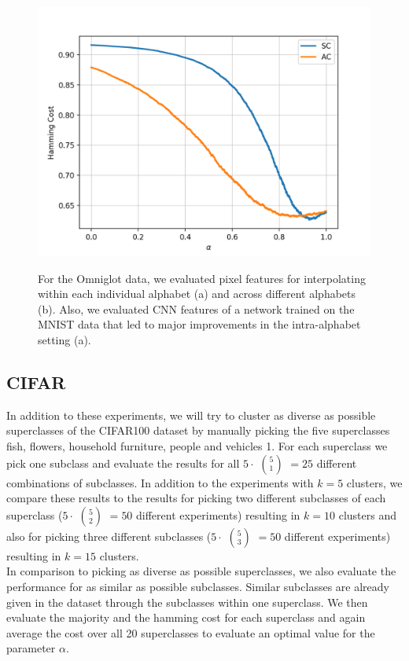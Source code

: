 \begin{figure}[H]
\begin{minipage}{.45\textwidth}
  {\includegraphics[width=\linewidth]{plots/omniglot_inter}}
\end{minipage}
\caption{For the Omniglot data, we evaluated pixel features for interpolating within each individual alphabet (a) and across different alphabets (b). Also, we evaluated CNN features of a network trained on the MNIST data that led to major improvements in the intra-alphabet setting (a).}
\label{fig:omniglot_overview}
\end{figure}

\subsection{CIFAR}

In addition to these experiments, we will try to cluster as diverse as possible superclasses of the CIFAR100 dataset by manually picking the five superclasses fish, flowers, household furniture, people and vehicles 1. For each superclass we pick one subclass and evaluate the results for all $5 \cdot$ $5 \choose 1$ $= 25$ different combinations of subclasses. In addition to the experiments with $k = 5$ clusters, we compare these results to the results for picking two different subclasses of each superclass ($5 \cdot$ $5 \choose 2$ $= 50$ different experiments) resulting in $k = 10$ clusters and also for picking three different subclasses ($5 \cdot$ $5 \choose 3$ $= 50$ different experiments) resulting in $k = 15$ clusters.\\

In comparison to picking as diverse as possible superclasses, we also evaluate the performance for as similar as possible subclasses. Similar subclasses are already given in the dataset through the subclasses within one superclass. We then evaluate the majority and the hamming cost for each superclass and again average the cost over all 20 superclasses to evaluate an optimal value for the parameter $\alpha$.

